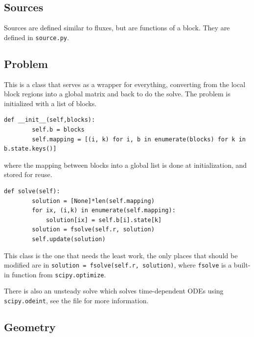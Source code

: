\documentclass[11pt]{article}
\begin{document}
\subsection{Sources}
Sources are defined similar to fluxes, but are functions of a block. They are defined in \lstinline{source.py}.
\subsection{Problem}
This is a class that serves as a wrapper for everything, converting from the local block regions into a global matrix and back to do the solve. The problem is initialized with a list of blocks.
\begin{lstlisting}
def __init__(self,blocks):
		self.b = blocks
		self.mapping = [(i, k) for i, b in enumerate(blocks) for k in b.state.keys()]
\end{lstlisting}
where the mapping between blocks into a global list is done at initialization, and stored for reuse. 
\begin{lstlisting}
def solve(self):
		solution = [None]*len(self.mapping)
		for ix, (i,k) in enumerate(self.mapping):
			solution[ix] = self.b[i].state[k]
		solution = fsolve(self.r, solution)
		self.update(solution)
\end{lstlisting}
This class is the one that needs the least work, the only places that should be modified are in \lstinline{solution = fsolve(self.r, solution)}, where \lstinline{fsolve} is a built-in function from \lstinline{scipy.optimize}.

There is also an unsteady solve which solves time-dependent ODEs using \lstinline{scipy.odeint}, see the file for more information.

\subsection{Geometry}
\end{document}
